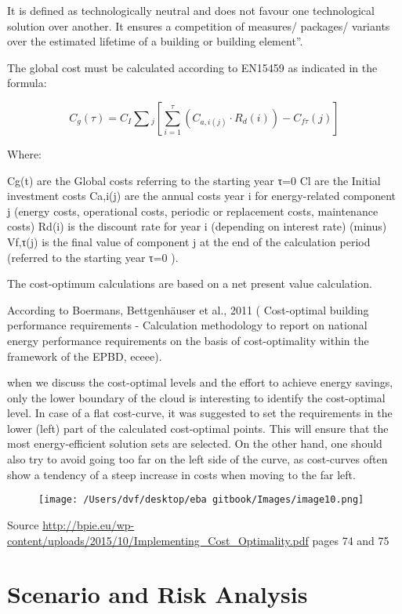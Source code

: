 \documentclass[]{book}
\theoremstyle{definition}
\theoremstyle{definition}
\theoremstyle{definition}
\theoremstyle{remark}
\begin{document}
It is defined as technologically neutral and does not favour one
technological solution over another. It ensures a competition of
measures/ packages/ variants over the estimated lifetime of a building
or building element''.

The global cost must be calculated according to EN15459 as indicated in
the formula:

\[C_{g}(\tau) = C_I \sum{_j}[ \sum_{i=1}^{\tau}(C_{a,i(j)} \cdot R_d(i)) - C_{f\tau}(j)]\]

Where:

Cg(t) are the Global costs referring to the starting year τ=0 Cl are the
Initial investment costs Ca,i(j) are the annual costs year i for
energy-related component j (energy costs, operational costs, periodic or
replacement costs, maintenance costs) Rd(i) is the discount rate for
year i (depending on interest rate) (minus) Vf,τ(j) is the final value
of component j at the end of the calculation period (referred to the
starting year τ=0 ).

The cost-optimum calculations are based on a net present value
calculation.

According to Boermans, Bettgenhäuser et al., 2011 ( Cost-optimal
building performance requirements - Calculation methodology to report on
national energy performance requirements on the basis of cost-optimality
within the framework of the EPBD, eceee).

when we discuss the cost-optimal levels and the effort to achieve energy
savings, only the lower boundary of the cloud is interesting to identify
the cost-optimal level. In case of a flat cost-curve, it was suggested
to set the requirements in the lower (left) part of the calculated
cost-optimal points. This will ensure that the most energy-efficient
solution sets are selected. On the other hand, one should also try to
avoid going too far on the left side of the curve, as cost-curves often
show a tendency of a steep increase in costs when moving to the far
left.

\begin{figure}[htbp]
\centering
\texttt{[image: /Users/dvf/desktop/eba gitbook/Images/image10.png]}
\caption{}
\end{figure}

Source
\url{http://bpie.eu/wp-content/uploads/2015/10/Implementing_Cost_Optimality.pdf}
pages 74 and 75

\section{Scenario and Risk Analysis}\label{scenario-and-risk-analysis}
\end{document}
